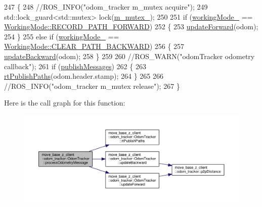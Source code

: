 \begin{DoxyCode}
247 \{
248     \textcolor{comment}{//ROS\_INFO("odom\_tracker m\_mutex acquire");}
249     std::lock\_guard<std::mutex> lock(\hyperlink{classmove__base__z__client_1_1odom__tracker_1_1OdomTracker_a63676e03be48b18ac48d5e2f11f19a25}{m\_mutex\_});
250 
251     \textcolor{keywordflow}{if} (\hyperlink{classmove__base__z__client_1_1odom__tracker_1_1OdomTracker_a39c97d7bf6003fde62e0bed1a221e3f0}{workingMode\_} == \hyperlink{namespacemove__base__z__client_1_1odom__tracker_adf3e5fc3644563922cc64a20a0197224a989d06a586bcf9520889228da7faa643}{WorkingMode::RECORD\_PATH\_FORWARD})
252     \{
253         \hyperlink{classmove__base__z__client_1_1odom__tracker_1_1OdomTracker_a12cee73239bc7685c645f8f52859b61f}{updateForward}(odom);
254     \}
255     \textcolor{keywordflow}{else} \textcolor{keywordflow}{if} (\hyperlink{classmove__base__z__client_1_1odom__tracker_1_1OdomTracker_a39c97d7bf6003fde62e0bed1a221e3f0}{workingMode\_} == \hyperlink{namespacemove__base__z__client_1_1odom__tracker_adf3e5fc3644563922cc64a20a0197224a0cf8f27617189e35619df3c18bda6274}{WorkingMode::CLEAR\_PATH\_BACKWARD})
256     \{
257         \hyperlink{classmove__base__z__client_1_1odom__tracker_1_1OdomTracker_ae613af99d85a8aa18c632e76efe41113}{updateBackward}(odom);
258     \}
259 
260     \textcolor{comment}{//ROS\_WARN("odomTracker odometry callback");}
261     \textcolor{keywordflow}{if} (\hyperlink{classmove__base__z__client_1_1odom__tracker_1_1OdomTracker_a7fa39bb2ddd9e60778687c854ea0c59c}{publishMessages})
262     \{
263         \hyperlink{classmove__base__z__client_1_1odom__tracker_1_1OdomTracker_a6ee06474c7aea4423a7937c8ebc193ad}{rtPublishPaths}(odom.header.stamp);
264     \}
265 
266     \textcolor{comment}{//ROS\_INFO("odom\_tracker m\_mutex release");}
267 \}
\end{DoxyCode}


Here is the call graph for this function\+:\nopagebreak
\begin{figure}[H]
\begin{center}
\leavevmode
\includegraphics[width=350pt]{classmove__base__z__client_1_1odom__tracker_1_1OdomTracker_a79b9f1e3b15fa6ac82dd93ab78e23579_cgraph}
\end{center}
\end{figure}




